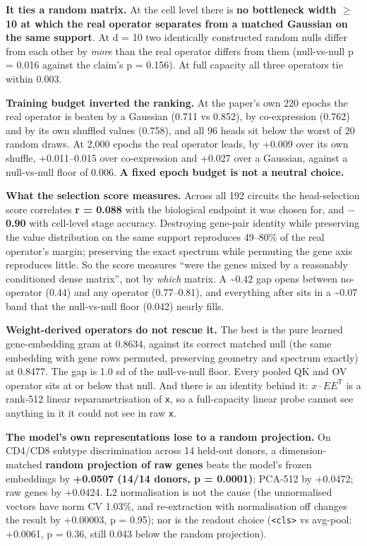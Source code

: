 \textbf{It ties a random matrix.} At the cell level there is \textbf{no bottleneck width \(\ge\) 10 at which the real
operator separates from a matched Gaussian on the same support}. At d = 10 two identically constructed
random nulls differ from each other by \emph{more} than the real operator differs from them (null-vs-null
p = 0.016 against the claim's p = 0.156). At full capacity all three operators tie within 0.003.

\textbf{Training budget inverted the ranking.} At the paper's own 220 epochs the real operator is beaten by
a Gaussian (0.711 vs 0.852), by co-expression (0.762) and by its own shuffled values (0.758), and all
96 heads sit below the worst of 20 random draws. At 2,000 epochs the real operator leads, by +0.009
over its own shuffle, +0.011--0.015 over co-expression and +0.027 over a Gaussian, against a
null-vs-null floor of 0.006. \textbf{A fixed epoch budget is not a neutral choice.}

\textbf{What the selection score measures.} Across all 192 circuits the head-selection score correlates
\textbf{r = 0.088} with the biological endpoint it was chosen for, and \textbf{\(-\)0.90} with cell-level stage
accuracy. Destroying gene-pair identity while preserving the value distribution on the same support
reproduces 49--80\% of the real operator's margin; preserving the exact spectrum while permuting the gene
axis reproduces little. So the score measures ``were the genes mixed by a reasonably conditioned dense
matrix'', not by \emph{which} matrix. A \textasciitilde0.42 gap opens between no-operator (0.44) and any operator
(0.77--0.81), and everything after sits in a \textasciitilde0.07 band that the null-vs-null floor (0.042) nearly
fills.

\textbf{Weight-derived operators do not rescue it.} The best is the pure learned gene-embedding gram at
0.8634, against its correct matched null (the same embedding with gene rows permuted, preserving
geometry and spectrum exactly) at 0.8477. The gap is 1.0 sd of the null-vs-null floor. Every pooled
QK and OV operator sits at or below that null. And there is an identity behind it: \(x\cdot EE^{\mathsf{T}}\) is a
rank-512 linear reparametrisation of \texttt{x}, so a full-capacity linear probe cannot see anything in it it
could not see in raw \texttt{x}.

\textbf{The model's own representations lose to a random projection.} On CD4/CD8 subtype discrimination
across 14 held-out donors, a dimension-matched \textbf{random projection of raw genes} beats the model's
frozen embeddings by \textbf{+0.0507 (14/14 donors, p = 0.0001)}; PCA-512 by +0.0472; raw genes by +0.0424.
L2 normalisation is not the cause (the unnormalised vectors have norm CV 1.03\%, and re-extraction with
normalisation off changes the result by +0.00003, p = 0.95); nor is the readout choice (\texttt{\textless{}cls\textgreater{}} vs
avg-pool: +0.0061, p = 0.36, still 0.043 below the random projection).

